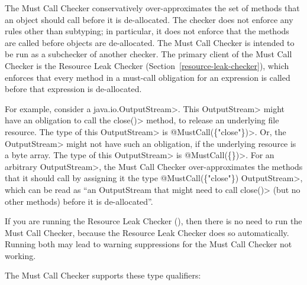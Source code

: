 \htmlhr
{}

The Must Call Checker conservatively over-approximates
the set of methods that an object should call before it is de-allocated.
The checker does not enforce any rules other than subtyping;
in particular, it does not enforce that the methods are called before
objects are de-allocated.
The Must Call Checker is intended to be run as a subchecker of another checker.
The primary client
of the Must Call Checker is the Resource Leak Checker (Section~\ref{resource-leak-checker}),
which enforces that every method in a must-call obligation for an expression is called
before that expression is de-allocated.

For example, consider a \<java.io.OutputStream>.  This \<OutputStream>
might have an obligation to call the \<close()> method, to release an
underlying file resource. The type of this \<OutputStream> is
\<@MustCall(\{"close"\})>.  Or, the \<OutputStream> might not have such an
obligation, if the underlying resource is a byte array. The type of this
\<OutputStream> is \<@MustCall(\{\})>.
For an arbitrary \<OutputStream>, the Must Call
Checker over-approximates the methods that it should call by assigning it
the type \<@MustCall(\{"close"\}) OutputStream>, which can be read as ``an
OutputStream that might need to call \<close()> (but no other methods)
before it is de-allocated''.

If you are running the Resource Leak Checker
(), then there is no need to run the
Must Call Checker, because the Resource Leak Checker does so automatically.
Running both may lead to warning suppressions for the Must Call Checker not
working.



The Must Call Checker supports these type qualifiers:

